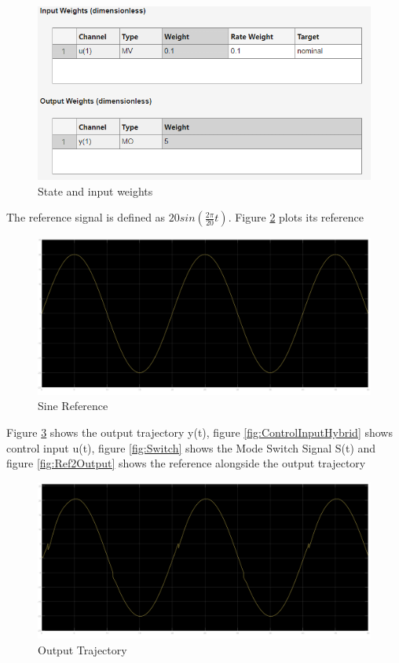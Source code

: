 \documentclass{article}
\begin{document}
\begin{figure}[htbp]
    \centering
    \includegraphics[width=\linewidth]{images/Input_Output_Weight.png}
    \caption{State and input weights}
    \label{fig:weight}
\end{figure}

The reference signal is defined as $20sin(\frac{2\pi}{20}t)$. Figure \ref{fig:reference} plots its reference

\begin{figure}[htbp]
    \centering
    \includegraphics[width=\linewidth]{images/Sine_Reference.png}
    \caption{Sine Reference}
    \label{fig:reference}
\end{figure}

Figure \ref{fig:output:trajectory} shows the output trajectory y(t), figure \ref{fig:ControlInputHybrid} shows control input u(t), figure \ref{fig:Switch} shows the Mode Switch Signal S(t) and figure \ref{fig:Ref2Output} shows the reference alongside the output trajectory

\begin{figure}[htbp]
    \centering
    \includegraphics[width=\linewidth]{images/output_trajectory_hybrid.png}
    \caption{Output Trajectory}
    \label{fig:output:trajectory}
\end{figure}
\end{document}
